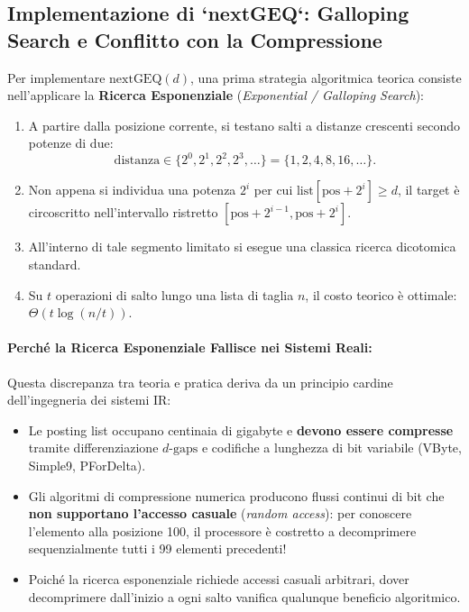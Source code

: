 \subsection{Implementazione di `nextGEQ`: Galloping Search e Conflitto con la Compressione}
Per implementare $\text{nextGEQ}(d)$, una prima strategia algoritmica teorica consiste nell'applicare la \textbf{Ricerca Esponenziale} (\textit{Exponential / Galloping Search}):
\begin{enumerate}
    \item A partire dalla posizione corrente, si testano salti a distanze crescenti secondo potenze di due:
    \[
    \text{distanza} \in \{2^0, 2^1, 2^2, 2^3, \dots\} = \{1, 2, 4, 8, 16, \dots\}.
    \]
    \item Non appena si individua una potenza $2^i$ per cui $\text{list}[\text{pos} + 2^i] \ge d$, il target \`e circoscritto nell'intervallo ristretto $[\text{pos} + 2^{i-1}, \text{pos} + 2^i]$.
    \item All'interno di tale segmento limitato si esegue una classica ricerca dicotomica standard.
    \item Su $t$ operazioni di salto lungo una lista di taglia $n$, il costo teorico \`e ottimale: $\Theta(t \log (n/t))$.
\end{enumerate}

\paragraph{Perch\'e la Ricerca Esponenziale Fallisce nei Sistemi Reali:}
Questa discrepanza tra teoria e pratica deriva da un principio cardine dell'ingegneria dei sistemi IR:
\begin{itemize}
    \item Le posting list occupano centinaia di gigabyte e \textbf{devono essere compresse} tramite differenziazione $d\text{-gaps}$ e codifiche a lunghezza di bit variabile (VByte, Simple9, PForDelta).
    \item Gli algoritmi di compressione numerica producono flussi continui di bit che \textbf{non supportano l'accesso casuale} (\textit{random access}): per conoscere l'elemento alla posizione 100, il processore \`e costretto a decomprimere sequenzialmente tutti i 99 elementi precedenti!
    \item Poich\'e la ricerca esponenziale richiede accessi casuali arbitrari, dover decomprimere dall'inizio a ogni salto vanifica qualunque beneficio algoritmico.
\end{itemize}

